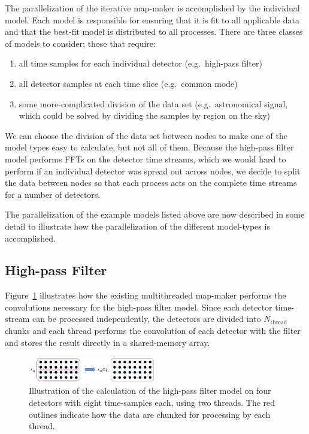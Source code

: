 \documentclass[oneside,11pt]{starlink}
\begin{document}
The parallelization of the iterative map-maker is accomplished by the
individual model. Each model is responsible for ensuring that it is
fit to all applicable data and that the best-fit model is distributed
to all processes. There are three classes of models to consider; those
that require:

\begin{enumerate}
\item all time samples for each individual detector (e.g.\ high-pass
  filter)
\item all detector samples at each time slice (e.g.\ common mode)
\item some more-complicated division of the data set
  (e.g.\ astronomical signal, which could be solved by dividing the
  samples by region on the sky)
\end{enumerate}

We can choose the division of the data set between nodes to make one
of the model types easy to calculate, but not all of them. Because the
high-pass filter model performs FFTs on the detector time streams,
which we would hard to perform if an individual detector was spread
out across nodes, we decide to split the data between nodes so that
each process acts on the complete time streams for a number of
detectors.

The parallelization of the example models listed above are now described
in some detail to illustrate how the parallelization of the different
model-types is accomplished.

\subsection{High-pass Filter}

Figure~\ref{fig:serial_highpass} illustrates how the existing
multithreaded map-maker performs the convolutions necessary for the
high-pass filter model. Since each detector time-stream can be
processed independently, the detectors are divided into
$N_\mathrm{thread}$ chunks and each thread performs the convolution of
each detector with the filter and stores the result directly in a
shared-memory array.

\begin{figure}[ht]
\begin{center}
\includegraphics[width=0.5\textwidth]{ssn79_serial_highpass}
\caption[Serial High-pass Filter Model]{Illustration of the
  calculation of the high-pass filter model on four detectors with
  eight time-samples each, using two threads. The red outlines
  indicate how the data are chunked for processing by each thread.}
\label{fig:serial_highpass}
\end{center}
\end{figure}
\end{document}

